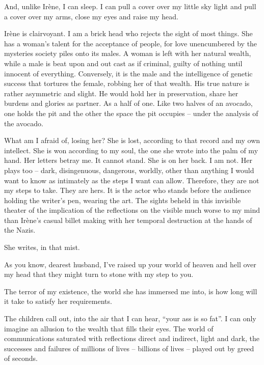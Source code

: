 And, unlike Ir\`{e}ne, I can sleep.  I can pull a cover over my little sky
light and pull a cover over my arms, close my eyes and raise my head.

\vfill
\break

﻿Ir\`{e}ne is clairvoyant.  I am a brick head who rejects the sight of most
things.  She has a woman's talent for the acceptance of people, for
love unencumbered by the mysteries society piles onto its males.  A
woman is left with her natural wealth, while a male is beat upon and
out cast as if criminal, guilty of nothing until innocent of
everything.  Conversely, it is the male and the intelligence of
genetic success that tortures the female, robbing her of that wealth.
His true nature is rather asymmetric and slight.  He would hold her in
preservation, share her burdens and glories as partner.  As a half of
one.  Like two halves of an avocado, one holds the pit and the other
the space the pit occupies -- under the analysis of the avocado.

What am I afraid of, losing her?  She is lost, according to that
record and my own intellect.  She is won according to my soul, the one
she wrote into the palm of my hand.  Her letters betray me.  It cannot
stand.  She is on her back.  I am not.  Her plays too -- dark,
disingenuous, dangerous, worldly, other than anything I would want to
know as intimately as the steps I want can allow.  Therefore, they are
not my steps to take.  They are hers.  It is the actor who stands
before the audience holding the writer's pen, wearing the art.  The
sights beheld in this invisible theater of the implication of the
reflections on the visible much worse to my mind than Ir\`{e}ne's
casual billet making with her temporal destruction at the hands of the
Nazis.

She writes, in that mist.

As you know, dearest husband, I've raised up your world of heaven and
hell over my head that they might turn to stone with my step to you.

The terror of my existence, the world she has immersed me into, is how
long will it take to satisfy her requirements.

The children call out, into the air that I can hear, ``your ass is so
fat''.  I can only imagine an allusion to the wealth that fills their
eyes.  The world of communications saturated with reflections direct
and indirect, light and dark, the successes and failures of millions
of lives -- billions of lives -- played out by greed of seconds.

